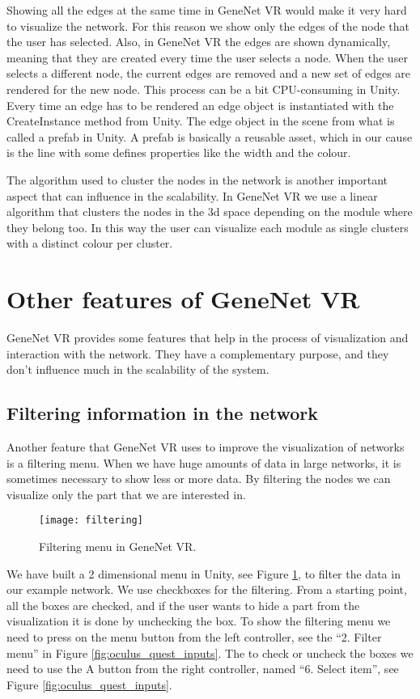 Showing all the edges at the same time in GeneNet VR would make it very hard to visualize the network. For this reason we show only the edges of the node that the user has selected. Also, in GeneNet VR the edges are shown dynamically, meaning that they are created every time the user selects a node. When the user selects a different node, the current edges are removed and a new set of edges are rendered for the new node. This process can be a bit CPU-consuming in Unity. Every time an edge has to be rendered an edge object is instantiated with the CreateInstance method from Unity. The edge object in the scene from what is called a prefab in Unity. A prefab \cite{prefab} is basically a reusable asset, which in our cause is the line with some defines properties like the width and the colour.

The algorithm used to cluster the nodes in the network is another important aspect that can influence in the scalability. In GeneNet VR we use a linear algorithm that clusters the nodes in the 3d space depending on the module where they belong too. In this way the user can visualize each module as single clusters with a distinct colour per cluster.

\section{Other features of GeneNet VR}
GeneNet VR provides some features that help in the process of visualization and interaction with the network. They have a complementary purpose, and they don't influence much in the scalability of the system.

\subsection{Filtering information in the network}
Another feature that GeneNet VR uses to improve the visualization of networks is a filtering menu. When we have huge amounts of data in large networks, it is sometimes necessary to show less or more data. By filtering the nodes we can visualize only the part that we are interested in.

\begin{figure}[h!]
    \centering%
    \texttt{[image: filtering]}
    \caption{Filtering menu in GeneNet VR.}
    \label{fig:filtering}
\end{figure}%

We have built a 2 dimensional menu in Unity, see Figure \ref{fig:filtering}, to filter the data in our example network. We use checkboxes for the filtering. From a starting point, all the boxes are checked, and if the user wants to hide a part from the visualization it is done by unchecking the box. To show the filtering menu we need to press on the menu button from the left controller, see the “2. Filter menu” in Figure \ref{fig:oculus_quest_inputs}. The to check or uncheck the boxes we need to use the A button from the right controller, named “6. Select item”, see Figure \ref{fig:oculus_quest_inputs}.


